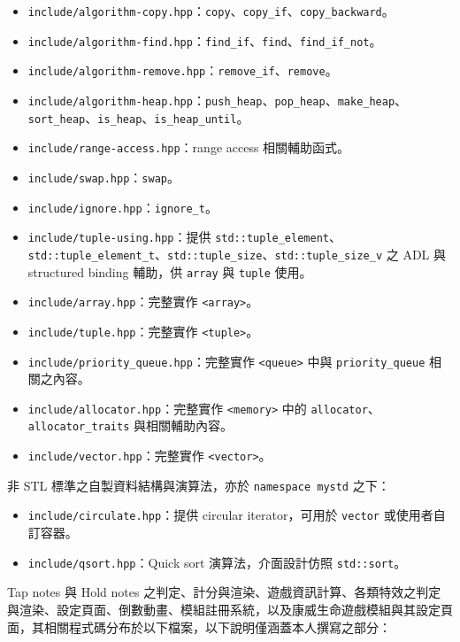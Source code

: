 \documentclass[a4paper,12pt]{article}
\begin{document}
\begin{itemize}
\item \verb|include/algorithm-copy.hpp|：\verb|copy|、\verb|copy_if|、\verb|copy_backward|。
\item \verb|include/algorithm-find.hpp|：\verb|find_if|、\verb|find|、\verb|find_if_not|。
\item \verb|include/algorithm-remove.hpp|：\verb|remove_if|、\verb|remove|。
\item \verb|include/algorithm-heap.hpp|：\verb|push_heap|、\verb|pop_heap|、\verb|make_heap|、\verb|sort_heap|、\verb|is_heap|、\verb|is_heap_until|。
\item \verb|include/range-access.hpp|：range access 相關輔助函式。
\item \verb|include/swap.hpp|：\verb|swap|。
\item \verb|include/ignore.hpp|：\verb|ignore_t|。
\item \verb|include/tuple-using.hpp|：提供 \verb|std::tuple_element|、\verb|std::tuple_element_t|、\verb|std::tuple_size|、\verb|std::tuple_size_v| 之 ADL 與 structured binding 輔助，供 \verb|array| 與 \verb|tuple| 使用。
\item \verb|include/array.hpp|：完整實作 \verb|<array>|。
\item \verb|include/tuple.hpp|：完整實作 \verb|<tuple>|。
\item \verb|include/priority_queue.hpp|：完整實作 \verb|<queue>| 中與 \verb|priority_queue| 相關之內容。
\item \verb|include/allocator.hpp|：完整實作 \verb|<memory>| 中的 \verb|allocator|、\verb|allocator_traits| 與相關輔助內容。
\item \verb|include/vector.hpp|：完整實作 \verb|<vector>|。
\end{itemize}
非 STL 標準之自製資料結構與演算法，亦於 \texttt{namespace mystd} 之下：
\begin{itemize}
\item \verb|include/circulate.hpp|：提供 circular iterator，可用於 \verb|vector| 或使用者自訂容器。
\item \verb|include/qsort.hpp|：Quick sort 演算法，介面設計仿照 \verb|std::sort|。
\end{itemize}
Tap notes 與 Hold notes 之判定、計分與渲染、遊戲資訊計算、各類特效之判定與渲染、設定頁面、倒數動畫、模組註冊系統，以及康威生命遊戲模組與其設定頁面，其相關程式碼分布於以下檔案，以下說明僅涵蓋本人撰寫之部分：
\end{document}
